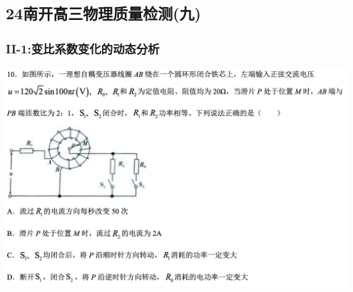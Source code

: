 \documentclass{article}
\begin{document}
\vspace{2em}

\subsection{24南开高三物理质量检测(九)}
\subsubsection{II-1:变比系数变化的动态分析}
\includegraphics[width=0.95\textwidth,keepaspectratio]{./pictures/3.7-1.png}
\end{document}
